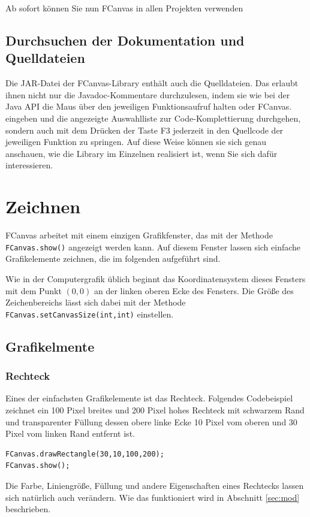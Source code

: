 \documentclass{article}
\newcommand{\enquote}[1]{\glqq{}#1\grqq{}}
\begin{document}
Ab sofort können Sie nun FCanvas in allen Projekten verwenden
\subsection{Durchsuchen der Dokumentation und Quelldateien}
Die JAR-Datei der FCanvas-Library enthält auch die Quelldateien. Das erlaubt ihnen nicht nur die Javadoc-Kommentare durchzulesen, indem sie wie bei der Java API die Maus über den jeweiligen Funktionsaufruf halten oder \enquote{FCanvas.} eingeben und die angezeigte Auswahlliste zur Code-Komplettierung durchgehen, sondern auch mit dem Drücken der Taste F3 jederzeit in den Quellcode der jeweiligen Funktion zu springen. Auf diese Weise können sie sich genau anschauen, wie die Library im Einzelnen realisiert ist, wenn Sie sich dafür interessieren.

\section{Zeichnen}
FCanvas arbeitet mit einem einzigen Grafikfenster, das mit der Methode {\tt FCanvas.show()} angezeigt werden kann. Auf diesem Fenster lassen sich einfache Grafikelemente zeichnen, die im folgenden aufgeführt sind.

Wie in der Computergrafik üblich beginnt das Koordinatensystem dieses Fensters mit dem Punkt $(0,0)$ an der linken oberen Ecke des Fensters. Die Größe des Zeichenbereichs lässt sich dabei mit der Methode {\tt FCanvas.setCanvasSize(int,int)} einstellen.
\subsection{Grafikelmente}
\label{sec:elem}
\subsubsection{Rechteck}
Eines der einfachsten Grafikelemente ist das Rechteck. Folgendes Codebeispiel zeichnet ein 100 Pixel breites und 200 Pixel hohes Rechteck mit schwarzem Rand und transparenter Füllung dessen obere linke Ecke 10 Pixel vom oberen und 30 Pixel vom linken Rand entfernt ist.

\begin{lstlisting}
FCanvas.drawRectangle(30,10,100,200);
FCanvas.show();
\end{lstlisting}

Die Farbe, Liniengröße, Füllung und andere Eigenschaften eines Rechtecks lassen sich natürlich auch verändern. Wie das funktioniert wird in Abschnitt \ref{sec:mod} beschrieben.
\end{document}
